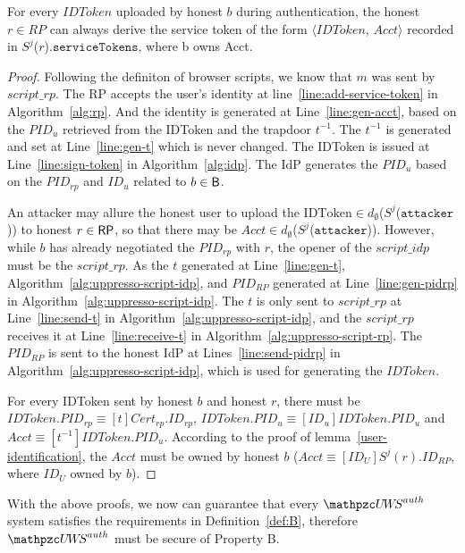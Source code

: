  \begin{lemma}
  For every $IDToken$ uploaded by honest $b$ during authentication, the honest $r \in RP$ can always derive the service token of the form $\langle IDToken$, $Acct \rangle$ recorded in $S^j$($r$).$\mathtt{serviceTokens}$, where b owns Acct. 
  \end{lemma}
  \begin{proof}
    Following the definiton of browser scripts, we know that $m$ was sent by $script\_rp$. 
    The RP accepts the user's identity at line~\ref{line:add-service-token} in Algorithm~\ref{alg:rp}.
    And the identity is generated at Line~\ref{line:gen-acct}, based on the $PID_u$ retrieved 
    from the IDToken and the trapdoor $t^{-1}$. The $t^{-1}$ is generated and set at 
    Line~\ref{line:gen-t} which is never changed. 
    The IDToken is issued at Line~\ref{line:sign-token} in Algorithm~\ref{alg:idp}.
    The IdP generates the $PID_u$ based on the $PID_{rp}$ and $ID_u$ related to $b \in \mathsf{B}$.
  
    An attacker may allure the honest user to upload the $\text{IDToken} \in d_{\emptyset}$($S^j$($\mathtt{attacker}$)) 
    to honest $r\in\mathsf{RP}$, so that there may be $Acct \in d_{\emptyset}$($S^j$($\mathtt{attacker}$)).
    However, while $b$ has already negotiated the $PID_{rp}$ with $r$, the opener of 
    the $script\_idp$ must be the $script\_rp$. As the $t$ generated at Line~\ref{line:gen-t}, 
    Algorithm~\ref{alg:uppresso-script-idp}, and $PID_{RP}$ generated at Line~\ref{line:gen-pidrp} 
    in Algorithm~\ref{alg:uppresso-script-idp}.
    The $t$ is only sent to $script\_rp$ at Line~\ref{line:send-t} in 
    Algorithm~\ref{alg:uppresso-script-idp}, 
    and the $script\_rp$ receives it at Line~\ref{line:receive-t} in 
    Algorithm~\ref{alg:uppresso-script-rp}.
    The $PID_{RP}$ is sent to the honest IdP at Lines~\ref{line:send-pidrp} in 
    Algorithm~\ref{alg:uppresso-script-idp},  which is used for generating the $IDToken$.
  
    For every IDToken sent by honest $b$ and honest $r$, there must be 
    $IDToken.PID_{rp} \equiv [t]Cert_{rp}.ID_{rp}$, 
    $IDToken.PID_u \equiv [ID_u]IDToken.PID_u$ and 
    $Acct \equiv [t^{-1}]IDToken.PID_u$. 
    According to the proof of lemma~\ref{user-identification}, 
    the $Acct$ must be owned by honest $b$ ($Acct \equiv [ID_U]S^j(r).ID_{RP}$, 
    where $ID_U$ owned by $b$).
  \end{proof}
  
  With the above proofs, we now can guarantee that every 
  $\uppressoauthwebsystem$ system satisfies the requirements in 
  Definition~\ref{def:B}, therefore $\uppressoauthwebsystem$ 
  must be secure of Property B.
  
